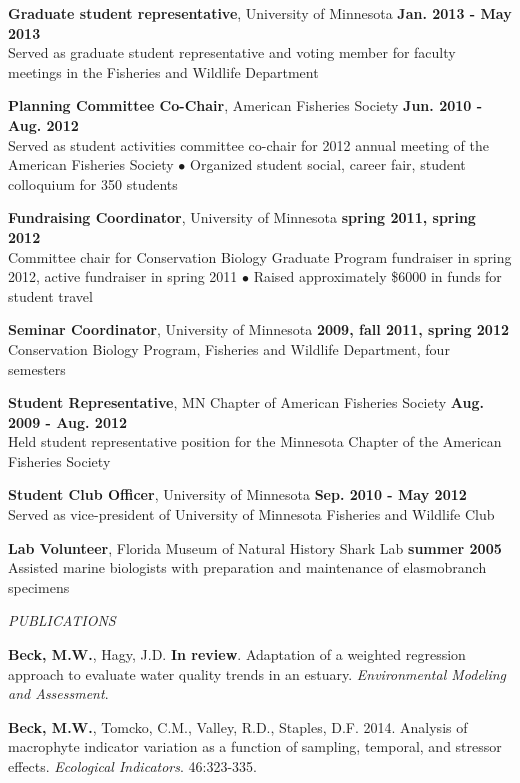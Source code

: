 \documentclass[letterpaper,12pt]{article}
\newcommand{\sectitle}[1]{\vspace{\baselineskip} \centerline{\large{\textit{#1}}}}
\begin{document}
{\bf Graduate student representative}, University of Minnesota \hfill {\bf Jan. 2013 - May 2013} \\
Served as graduate student representative and voting member for faculty meetings in the Fisheries and Wildlife Department

{\bf Planning Committee Co-Chair}, American Fisheries Society \hfill {\bf Jun. 2010 - Aug. 2012} \\
Served as student activities committee co-chair for 2012 annual meeting of the American Fisheries Society $\bullet$ Organized student social, career fair, student colloquium for 350 students

{\bf Fundraising Coordinator}, University of Minnesota \hfill {\bf spring 2011, spring 2012} \\
Committee chair for Conservation Biology Graduate Program fundraiser in spring 2012, active fundraiser in spring 2011 $\bullet$ Raised approximately \$6000 in funds for student travel

{\bf Seminar Coordinator}, University of Minnesota \hfill {\bf 2009, fall 2011, spring 2012} \\
Conservation Biology Program, Fisheries and Wildlife Department, four semesters

{\bf Student Representative}, MN Chapter of American Fisheries Society \hfill {\bf Aug. 2009 - Aug. 2012} \\
Held student representative position for the Minnesota Chapter of the American Fisheries Society

{\bf Student Club Officer}, University of Minnesota \hfill {\bf Sep. 2010 - May 2012} \\
Served as vice-president of University of Minnesota Fisheries and Wildlife Club

{\bf Lab Volunteer}, Florida Museum of Natural History Shark Lab \hfill {\bf summer 2005} \\
Assisted marine biologists with preparation and maintenance of elasmobranch specimens

\sectitle{PUBLICATIONS}

\textbf{Beck, M.W.}, Hagy, J.D. {\bf In review}. Adaptation of a weighted regression approach to evaluate water quality trends in an estuary. \textit{Environmental Modeling and Assessment}.

\textbf{Beck, M.W.}, Tomcko, C.M., Valley, R.D., Staples, D.F. 2014. Analysis of macrophyte indicator variation as a function of sampling, temporal, and stressor effects. \textit{Ecological Indicators}. 46:323-335.
\end{document}
